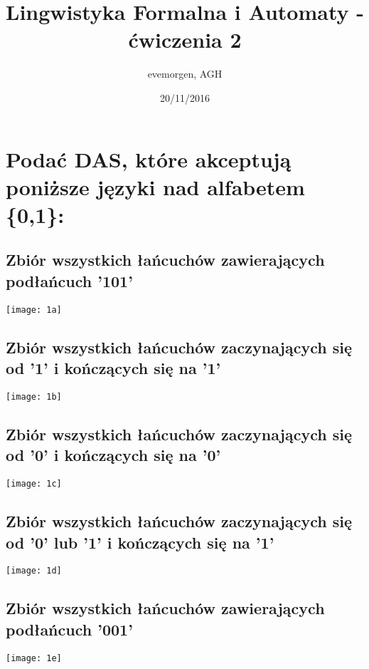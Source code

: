 \documentclass[a4paper,11pt]{article}
\begin{document}
\title{Lingwistyka Formalna i Automaty - ćwiczenia 2}
\author{evemorgen, AGH}
\date{20/11/2016}
\maketitle

\newpage
\section{Podać DAS, które akceptują poniższe języki nad alfabetem \{0,1\}:}
\subsection{Zbiór wszystkich łańcuchów zawierających podłańcuch '101'}
\begin{center}
	\texttt{[image: 1a]}
\end{center}

\subsection{Zbiór wszystkich łańcuchów zaczynających się od '1' i kończących się na '1'}
\begin{center}
	\texttt{[image: 1b]}
\end{center}

\subsection{Zbiór wszystkich łańcuchów zaczynających się od '0' i kończących się na '0'}
\begin{center}
	\texttt{[image: 1c]}
\end{center}

\subsection{Zbiór wszystkich łańcuchów zaczynających się od '0' lub '1' i kończących się na '1'}
\begin{center}
	\texttt{[image: 1d]}
\end{center}

\subsection{Zbiór wszystkich łańcuchów zawierających podłańcuch '001'}
\begin{center}
	\texttt{[image: 1e]}
\end{center}
\end{document}
